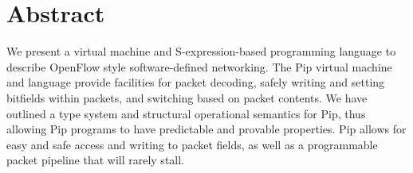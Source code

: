 
\section*{Abstract}
We present a virtual machine and S-expression-based programming language to describe OpenFlow style software-defined networking. The Pip virtual machine and language provide facilities for packet decoding, safely writing and setting bitfields within packets, and switching based on packet contents. We have outlined a type system and structural operational semantics for Pip, thus allowing Pip programs to have predictable and provable properties.
Pip allows for easy and safe access and writing to packet fields, as well as a programmable packet pipeline that will rarely stall.
